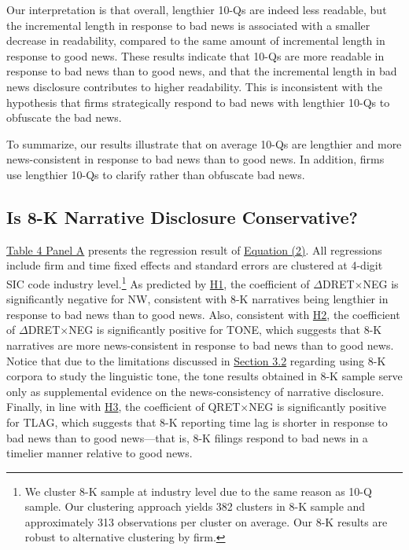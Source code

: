\documentclass[letterpaper,12pt]{article}
\begin{document}
\begin{spacing}{1.5}
Our interpretation is that overall, lengthier 10-Qs are indeed less readable, but the incremental length in response to bad news is associated with a smaller decrease in readability, compared to the same amount of incremental length in response to good news. These results indicate that 10-Qs are more readable in response to bad news than to good news, and that the incremental length in bad news disclosure contributes to higher readability. This is inconsistent with the hypothesis that firms strategically respond to bad news with lengthier 10-Qs to obfuscate the bad news. 

To summarize, our results illustrate that on average 10-Qs are lengthier and more news-consistent in response to bad news than to good news. In addition, firms use lengthier 10-Qs to clarify rather than obfuscate bad news.

\subsection{Is 8-K Narrative Disclosure Conservative?}
\noindent \hyperref[T4PA]{Table 4 Panel A} presents the regression result of \hyperref[eq2]{Equation (2)}. All regressions include firm and time fixed effects and standard errors are clustered at 4-digit SIC code industry level.\footnote{We cluster 8-K sample at industry level due to the same reason as 10-Q sample. Our clustering approach yields 382 clusters in 8-K sample and approximately 313 observations per cluster on average. Our 8-K results are robust to alternative clustering by firm. } As predicted by \hyperref[h1]{H1}, the coefficient of $\Delta$DRET$\times$NEG is significantly negative for NW, consistent with 8-K narratives being lengthier in response to bad news than to good news. Also, consistent with \hyperref[h2]{H2}, the coefficient of $\Delta$DRET$\times$NEG is significantly positive for TONE, which suggests that 8-K narratives are more news-consistent in response to bad news than to good news. Notice that due to the limitations discussed in \hyperref[sec3.2]{Section 3.2} regarding using 8-K corpora to study the linguistic tone, the tone results obtained in 8-K sample serve only as supplemental evidence on the news-consistency of narrative disclosure. Finally, in line with \hyperref[h3]{H3}, the coefficient of QRET$\times$NEG is significantly positive for TLAG, which suggests that 8-K reporting time lag is shorter in response to bad news than to good news---that is, 8-K filings respond to bad news in a timelier manner relative to good news. 


\end{spacing}
\end{document}
